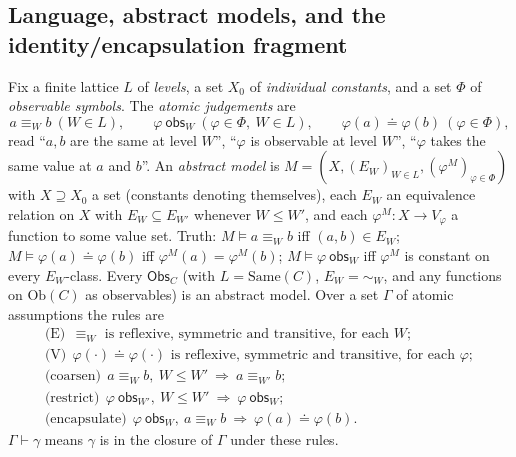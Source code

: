 \documentclass[11pt]{amsart}
\theoremstyle{definition}
\newcommand{\Same}{\mathrm{Same}}
\newcommand{\Ob}{\mathrm{Ob}}
\newcommand{\Obs}{\mathsf{Obs}}
\newcommand{\obs}{\ \mathsf{obs}}
\begin{document}
\subsection{Language, abstract models, and the identity/encapsulation fragment}
\label{sub:frag}
Fix a finite lattice $L$ of \emph{levels}, a set $X_0$ of \emph{individual
constants}, and a set $\Phi$ of \emph{observable symbols}. The \emph{atomic
judgements} are
\[
a\equiv_Wb\ (W\in L),\qquad \varphi\obs_W\ (\varphi\in\Phi,\ W\in L),\qquad
\varphi(a)\doteq\varphi(b)\ (\varphi\in\Phi),
\]
read ``$a,b$ are the same at level $W$'', ``$\varphi$ is observable at level
$W$'', ``$\varphi$ takes the same value at $a$ and $b$''. An \emph{abstract
model} is $M=(X,(E_W)_{W\in L},(\varphi^M)_{\varphi\in\Phi})$ with $X\supseteq
X_0$ a set (constants denoting themselves), each $E_W$ an equivalence relation
on $X$ with $E_W\subseteq E_{W'}$ whenever $W\le W'$, and each $\varphi^M\colon
X\to V_\varphi$ a function to some value set. Truth:
$M\models a\equiv_Wb$ iff $(a,b)\in E_W$; $M\models\varphi(a)\doteq\varphi(b)$
iff $\varphi^M(a)=\varphi^M(b)$; $M\models\varphi\obs_W$ iff $\varphi^M$ is
constant on every $E_W$-class. Every $\Obs_C$ (with $L=\Same(C)$, $E_W={\sim_W}$,
and any functions on $\Ob(C)$ as observables) is an abstract model. Over a set
$\Gamma$ of atomic assumptions the rules are
\[
\begin{array}{l}
\text{(E)}\ \ \equiv_W\text{ is reflexive, symmetric and transitive, for each }W;\\[2pt]
\text{(V)}\ \ \varphi(\cdot)\doteq\varphi(\cdot)\text{ is reflexive, symmetric and transitive, for each }\varphi;\\[2pt]
\text{(coarsen)}\ \ a\equiv_Wb,\ W\le W'\ \Rightarrow\ a\equiv_{W'}b;\\[2pt]
\text{(restrict)}\ \ \varphi\obs_{W'},\ W\le W'\ \Rightarrow\ \varphi\obs_W;\\[2pt]
\text{(encapsulate)}\ \ \varphi\obs_W,\ a\equiv_Wb\ \Rightarrow\ \varphi(a)\doteq\varphi(b).
\end{array}
\]
$\Gamma\vdash\gamma$ means $\gamma$ is in the closure of $\Gamma$ under these
rules.
\end{document}
